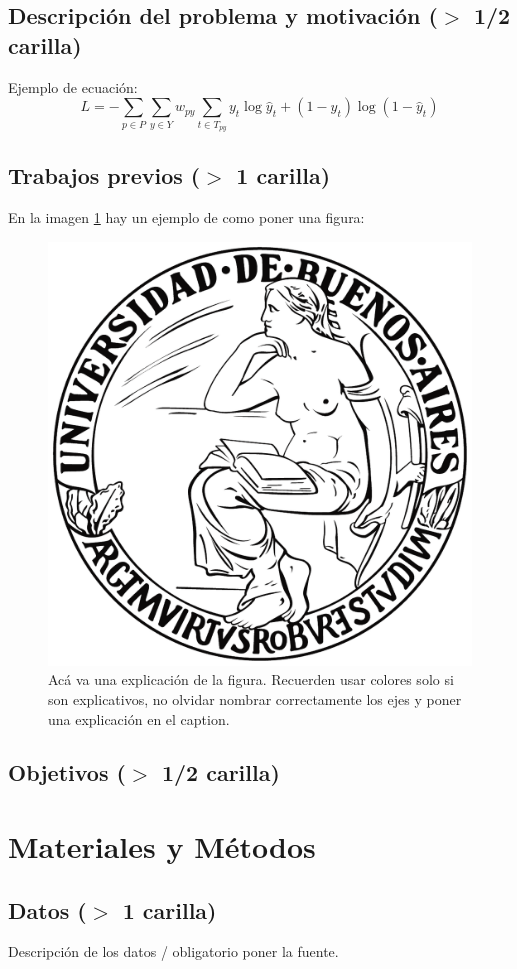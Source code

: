 \documentclass[11pt,a4paper,twoside]{tesis}
\begin{document}
\section{Descripción del problema y motivación ($>$ 1/2 carilla)}

Ejemplo de ecuación:
\begin{equation}
L = - \sum_{p \in P} \sum_{y \in Y} w_{py} \sum_{t \in T_{py}} y_t \log \hat y_t + (1-y_t) \log (1-\hat y_t)
\label{eq:loss}
\end{equation}

\section{Trabajos previos ($>$ 1 carilla)}
En la imagen \ref{fig:label} hay un ejemplo de como poner una figura:
\begin{figure}[h]
\centering
\includegraphics[width=0.5\columnwidth]{logouba.png}
\caption{Acá va una explicación de la figura. Recuerden usar colores solo si son explicativos, no olvidar nombrar correctamente los ejes y poner una explicación en el caption.}
\label{fig:label}
\end{figure}

\section{Objetivos ($>$ 1/2 carilla)}

\chapter{Materiales y Métodos}

\section{Datos ($>$ 1 carilla)} 
Descripción de los datos / obligatorio poner la fuente.
\end{document}

